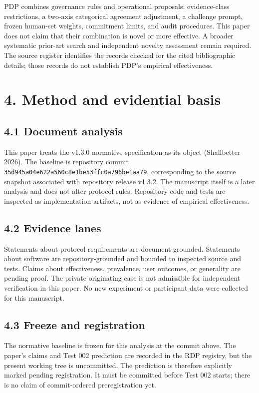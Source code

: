 \documentclass[
  english,
]{article}
\begin{document}
PDP combines governance rules and operational proposals: evidence-class
restrictions, a two-axis categorical agreement adjustment, a challenge
prompt, frozen human-set weights, commitment limits, and audit
procedures. This paper does not claim that their combination is novel or
more effective. A broader systematic prior-art search and independent
novelty assessment remain required. The source register identifies the
records checked for the cited bibliographic details; those records do
not establish PDP's empirical effectiveness.

\section{4. Method and evidential
basis}\label{method-and-evidential-basis}

\subsection{4.1 Document analysis}\label{document-analysis}

This paper treats the v1.3.0 normative specification as its object
(Shallbetter 2026). The baseline is repository commit
\texttt{35d945a04e622a560c8e1be53ffc0a796be1aa79}, corresponding to the
source snapshot associated with repository release v1.3.2. The
manuscript itself is a later analysis and does not alter protocol rules.
Repository code and tests are inspected as implementation artifacts, not
as evidence of empirical effectiveness.

\subsection{4.2 Evidence lanes}\label{evidence-lanes}

Statements about protocol requirements are document-grounded. Statements
about software are repository-grounded and bounded to inspected source
and tests. Claims about effectiveness, prevalence, user outcomes, or
generality are pending proof. The private originating case is not
admissible for independent verification in this paper. No new experiment
or participant data were collected for this manuscript.

\subsection{4.3 Freeze and registration}\label{freeze-and-registration}

The normative baseline is frozen for this analysis at the commit above.
The paper's claims and Test 002 prediction are recorded in the RDP
registry, but the present working tree is uncommitted. The prediction is
therefore explicitly marked pending registration. It must be committed
before Test 002 starts; there is no claim of commit-ordered
preregistration yet.
\end{document}
